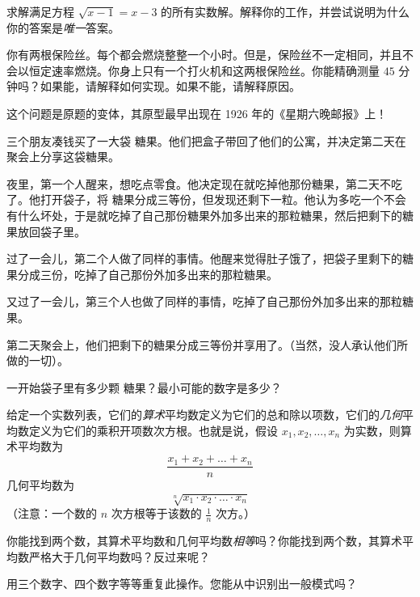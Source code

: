 \begin{exercise}
    求解满足方程 $\sqrt{x - 1} = x - 3$ 的所有实数解。解释你的工作，并尝试说明为什么你的答案是\textit{唯一}答案。
\end{exercise}

\begin{exercise}
    你有两根保险丝。每个都会燃烧整整一个小时。但是，保险丝不一定相同，并且不会以恒定速率燃烧。你身上只有一个打火机和这两根保险丝。你能精确测量 $45$ 分钟吗？如果能，请解释如何实现。如果不能，请解释原因。
\end{exercise}

\begin{exercise}
    这个问题是原题的变体，其原型最早出现在 1926 年的《星期六晚邮报》上！

    三个朋友凑钱买了一大袋  糖果。他们把盒子带回了他们的公寓，并决定第二天在聚会上分享这袋糖果。

    夜里，第一个人醒来，想吃点零食。他决定现在就吃掉他那份糖果，第二天不吃了。他打开袋子，将  糖果分成三等份，但发现还剩下一粒。他认为多吃一个不会有什么坏处，于是就吃掉了自己那份糖果外加多出来的那粒糖果，然后把剩下的糖果放回袋子里。

    过了一会儿，第二个人做了同样的事情。他醒来觉得肚子饿了，把袋子里剩下的糖果分成三份，吃掉了自己那份外加多出来的那粒糖果。

    又过了一会儿，第三个人也做了同样的事情，吃掉了自己那份外加多出来的那粒糖果。

    第二天聚会上，他们把剩下的糖果分成三等份并享用了。（当然，没人承认他们所做的一切）。

    一开始袋子里有多少颗  糖果？最小可能的数字是多少？
\end{exercise}

\begin{exercise}
    给定一个实数列表，它们的\textit{算术}平均数定义为它们的总和除以项数，它们的\textit{几何}平均数定义为它们的乘积开项数次方根。也就是说，假设 $x_1, x_2, \dots , x_n$ 为实数，则算术平均数为
    \[\frac{x_1+x_2+ \dots + x_n}{n}\]
    几何平均数为
    \[\sqrt[n]{x_1 \cdot x_2 \cdot \dots \cdot x_n}\]
    （注意：一个数的 $n$ 次方根等于该数的 $\frac{1}{n}$ 次方。）

    你能找到两个数，其算术平均数和几何平均数\textit{相等}吗？你能找到两个数，其算术平均数严格大于几何平均数吗？反过来呢？

    用三个数字、四个数字等等重复此操作。您能从中识别出一般模式吗？
\end{exercise}

